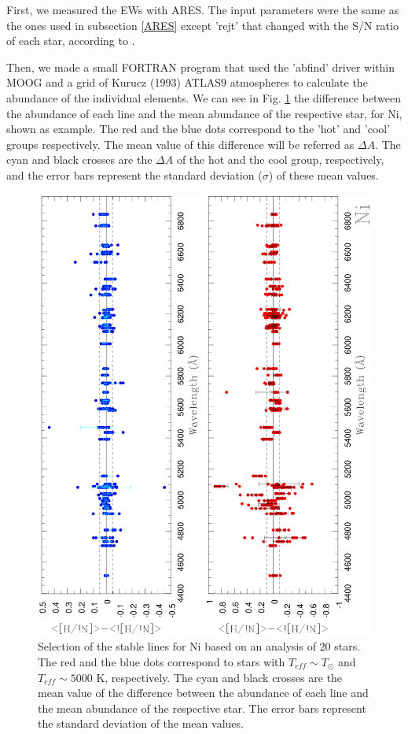 \documentclass[dvips,12pt,a4paper]{report}
\begin{document}
{First, we measured the EWs with ARES. The input parameters were the same as the ones used in subsection \ref{ARES} except 'rejt' that changed with the S/N ratio of each star, according to \citet{Sousa-2008}.

Then, we made a small FORTRAN program that used the 'abfind' driver within MOOG and a grid of Kurucz (1993) ATLAS9 atmospheres to calculate the abundance of the individual elements. We can see in Fig. \ref{Ni20} the difference between the abundance of each line and the mean abundance of the respective star, for Ni, shown as example. The red and the blue dots correspond to the 'hot' and 'cool' groups respectively. The mean value of this difference will be referred as $\Delta A$. The cyan and black crosses are the $\Delta A$ of the hot and the cool group, respectively, and the error bars represent the standard deviation ($\sigma$) of these mean values.

\begin{figure}[h]
\centering
\includegraphics[height=13 cm, angle=-90]{pics/Ni20.eps}
\caption[20 star delta ab graphics]{Selection of the stable lines for Ni based on an analysis of 20 stars. The red and the blue dots correspond to stars with $T_{eff}\sim T_\odot$ and $T_{eff}\sim 5000$ K, respectively. The cyan and black crosses are the mean value of the difference between the abundance of each line and the mean abundance of the respective star. The error bars represent the standard deviation of the mean values.}
\label{Ni20}
\end{figure}

}
\end{document}
